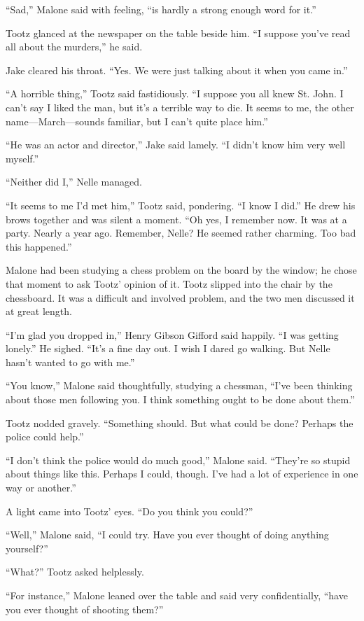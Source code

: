 \documentclass{novel}
\begin{document}
“Sad,” Malone said with feeling, “is hardly a strong enough word for it.”

Tootz glanced at the newspaper on the table beside him. “I suppose you’ve read all about the murders,” he said.

Jake cleared his throat. “Yes. We were just talking about it when you came in.”

“A horrible thing,” Tootz said fastidiously. “I suppose you all knew St. John. I can’t say I liked the man, but it’s a terrible way to die. It seems to me, the other name—March—sounds familiar, but I can’t quite place him.”

“He was an actor and director,” Jake said lamely. “I didn’t know him very well myself.”

“Neither did I,” Nelle managed.

“It seems to me I’d met him,” Tootz said, pondering. “I know I did.” He drew his brows together and was silent a moment. “Oh yes, I remember now. It was at a party. Nearly a year ago. Remember, Nelle? He seemed rather charming. Too bad this happened.”

Malone had been studying a chess problem on the board by the window; he chose that moment to ask Tootz’ opinion of it. Tootz slipped into the chair by the chessboard. It was a difficult and involved problem, and the two men discussed it at great length.

“I’m glad you dropped in,” Henry Gibson Gifford said happily. “I was getting lonely.” He sighed. “It’s a fine day out. I wish I dared go walking. But Nelle hasn’t wanted to go with me.”

“You know,” Malone said thoughtfully, studying a chessman, “I’ve been thinking about those men following you. I think something ought to be done about them.”

Tootz nodded gravely. “Something should. But what could be done? Perhaps the police could help.”

“I don’t think the police would do much good,” Malone said. “They’re so stupid about things like this. Perhaps I could, though. I’ve had a lot of experience in one way or another.”

A light came into Tootz’ eyes. “Do you think you could?”

“Well,” Malone said, “I could try. Have you ever thought of doing anything yourself?”

“What?” Tootz asked helplessly.

“For instance,” Malone leaned over the table and said very confidentially, “have you ever thought of shooting them?”
\end{document}
